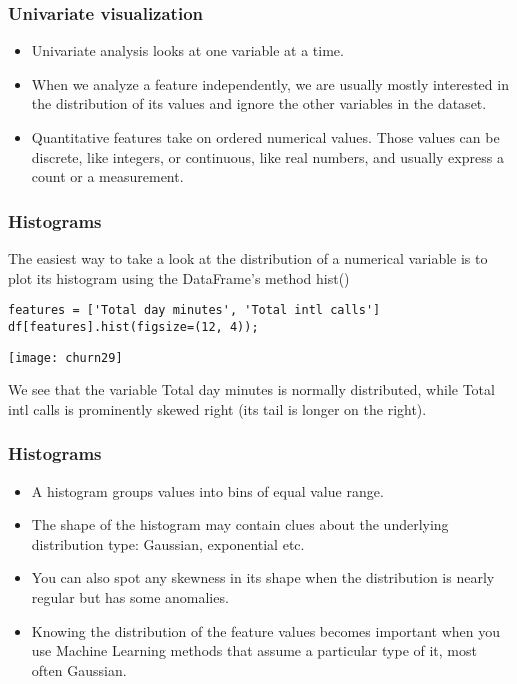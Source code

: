 \begin{frame}[fragile]\frametitle{Univariate visualization}	
\begin{itemize}
\item Univariate analysis looks at one variable at a time. 
\item When we analyze a feature independently, we are usually mostly interested in the distribution of its values and ignore the other variables in the dataset.
\item Quantitative features take on ordered numerical values. Those values can be discrete, like integers, or continuous, like real numbers, and usually express a count or a measurement.
\end{itemize}
\end{frame}

\begin{frame}[fragile]\frametitle{Histograms}
The easiest way to take a look at the distribution of a numerical variable is to plot its histogram using the DataFrame's method hist()
\begin{lstlisting}
features = ['Total day minutes', 'Total intl calls']
df[features].hist(figsize=(12, 4));
\end{lstlisting}
\begin{center}
\texttt{[image: churn29]}
\end{center}
We see that the variable Total day minutes is normally distributed, while Total intl calls is prominently skewed right (its tail is longer on the right).
\end{frame}

\begin{frame}[fragile]\frametitle{Histograms}
\begin{itemize}
\item A histogram groups values into bins of equal value range. 
\item The shape of the histogram may contain clues about the underlying distribution type: Gaussian, exponential etc. 
\item You can also spot any skewness in its shape when the distribution is nearly regular but has some anomalies. 
\item Knowing the distribution of the feature values becomes important when you use Machine Learning methods that assume a particular type of it, most often Gaussian.
\end{itemize}
\end{frame}


